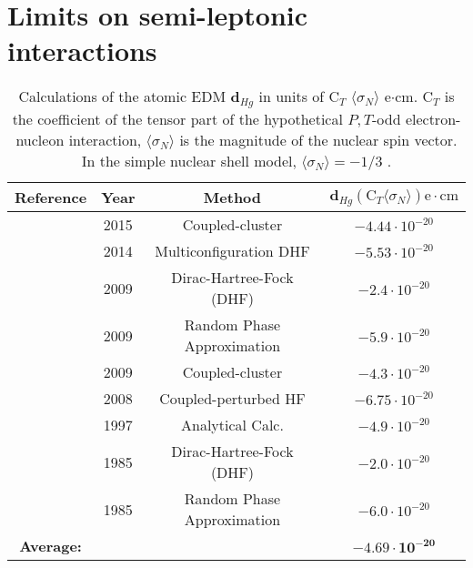 \documentclass [10pt, twoside] {uwthesis}[2012/04/02]
\begin{document}
\section{Limits on semi-leptonic interactions}
\begin{table}[t] 																%
\begin{center} 																	%
\caption[Semi-leptonic tensor interaction contributions to the $^{199}$Hg EDM]
{\narrower Calculations of the atomic EDM $\mathbf{d}_{Hg}$ in units of C$_T$ $\langle\sigma_N\rangle$ e$\cdot \text{cm}$. C$_T$ is the coefficient of the tensor part of the hypothetical $P,T$-odd electron-nucleon interaction, $\langle\sigma_N\rangle$ is the magnitude of the nuclear spin vector. In the simple nuclear shell model, $\langle\sigma_N\rangle = -1/3$ \cite{2004_Ginges_Flambaum_Fund._Symmetries_in_Atoms}.}\label{C_Table} 	
\begin{tabular}{cccc}		 													%
\hline \hline                													%
Reference & Year  & Method & $\mathbf{d}_{Hg} (\text{C}_T\langle\sigma_N\rangle) \text{e}\cdot \text{cm}$  \\ [0.5ex]	
\hline 
\cite{2015_Singh_and_Sahoo_Hg_Schiff_Moment}	& 2015 & Coupled-cluster			& $-4.44\cdot 10^{-20}$ \\
\cite{2014_Radziute_et_al_DHF_EDM}				& 2014 & Multiconfiguration DHF 	& $-5.53\cdot 10^{-20}$ \\
\cite{2009_Dzuba_Flambaum_Porsev_EDMvSM}		& 2009 & Dirac-Hartree-Fock (DHF)	& $-2.4 \cdot 10^{-20}$ \\
\cite{2009_Dzuba_Flambaum_Porsev_EDMvSM}		& 2009 & Random Phase Approximation	& $-5.9 \cdot 10^{-20}$ \\
\cite{2009_Latha_et_al_Hg_EDM}					& 2009 & Coupled-cluster			& $-4.3 \cdot 10^{-20}$ \\
\cite{2008_Latha_et_al_Core_Polarization_EDM}	& 2008 & Coupled-perturbed HF		& $-6.75\cdot 10^{-20}$ \\
\cite{Khriplovich_Lamoreaux}					& 1997 & Analytical Calc.			& $-4.9 \cdot 10^{-20}$ \\ 
\cite{1985_Martensson_C_T_calc}					& 1985 & Dirac-Hartree-Fock	(DHF)	& $-2.0 \cdot 10^{-20}$ \\
\cite{1985_Martensson_C_T_calc}					& 1985 & Random Phase Approximation	& $-6.0 \cdot 10^{-20}$ \\
\hline
\textbf{Average:}								&	   &							&$\mathbf{-4.69\cdot 10^{-20}}$\\
\hline 
\hline																			%
\end{tabular} 
\end{center}														 
\end{table}	
\end{document}
